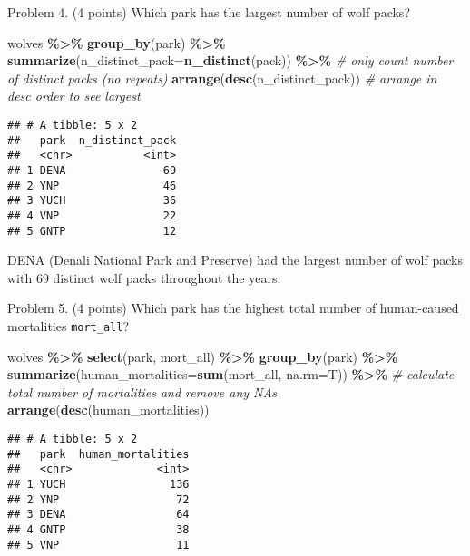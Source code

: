 \documentclass[
]{article}
\newenvironment{Shaded}{\begin{snugshade}}{\end{snugshade}}
\newcommand{\AttributeTok}[1]{\textcolor[rgb]{0.13,0.29,0.53}{#1}}
\newcommand{\CommentTok}[1]{\textcolor[rgb]{0.56,0.35,0.01}{\textit{#1}}}
\newcommand{\FunctionTok}[1]{\textcolor[rgb]{0.13,0.29,0.53}{\textbf{#1}}}
\newcommand{\NormalTok}[1]{#1}
\newcommand{\SpecialCharTok}[1]{\textcolor[rgb]{0.81,0.36,0.00}{\textbf{#1}}}
\begin{document}
Problem 4. (4 points) Which park has the largest number of wolf packs?

\begin{Shaded}
\begin{Highlighting}[]
\NormalTok{wolves }\SpecialCharTok{\%\textgreater{}\%}
  \FunctionTok{group\_by}\NormalTok{(park) }\SpecialCharTok{\%\textgreater{}\%}
  \FunctionTok{summarize}\NormalTok{(}\AttributeTok{n\_distinct\_pack=}\FunctionTok{n\_distinct}\NormalTok{(pack)) }\SpecialCharTok{\%\textgreater{}\%} \CommentTok{\# only count number of distinct packs (no repeats)}
  \FunctionTok{arrange}\NormalTok{(}\FunctionTok{desc}\NormalTok{(n\_distinct\_pack)) }\CommentTok{\# arrange in desc order to see largest}
\end{Highlighting}
\end{Shaded}

\begin{verbatim}
## # A tibble: 5 x 2
##   park  n_distinct_pack
##   <chr>           <int>
## 1 DENA               69
## 2 YNP                46
## 3 YUCH               36
## 4 VNP                22
## 5 GNTP               12
\end{verbatim}

DENA (Denali National Park and Preserve) had the largest number of wolf
packs with 69 distinct wolf packs throughout the years.

Problem 5. (4 points) Which park has the highest total number of
human-caused mortalities \texttt{mort\_all}?

\begin{Shaded}
\begin{Highlighting}[]
\NormalTok{wolves }\SpecialCharTok{\%\textgreater{}\%}
  \FunctionTok{select}\NormalTok{(park, mort\_all) }\SpecialCharTok{\%\textgreater{}\%}
  \FunctionTok{group\_by}\NormalTok{(park) }\SpecialCharTok{\%\textgreater{}\%}
  \FunctionTok{summarize}\NormalTok{(}\AttributeTok{human\_mortalities=}\FunctionTok{sum}\NormalTok{(mort\_all, }\AttributeTok{na.rm=}\NormalTok{T)) }\SpecialCharTok{\%\textgreater{}\%} \CommentTok{\# calculate total number of mortalities and remove any NAs}
  \FunctionTok{arrange}\NormalTok{(}\FunctionTok{desc}\NormalTok{(human\_mortalities))}
\end{Highlighting}
\end{Shaded}

\begin{verbatim}
## # A tibble: 5 x 2
##   park  human_mortalities
##   <chr>             <int>
## 1 YUCH                136
## 2 YNP                  72
## 3 DENA                 64
## 4 GNTP                 38
## 5 VNP                  11
\end{verbatim}
\end{document}
